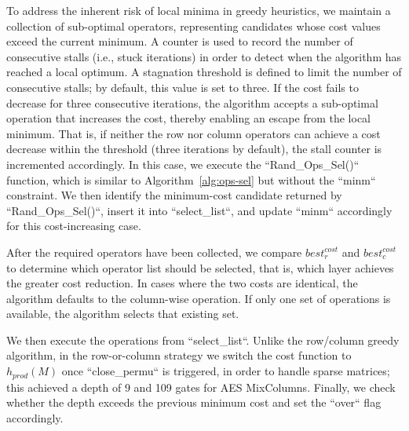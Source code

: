 To address the inherent risk of local minima in greedy heuristics, we 
maintain a collection of sub-optimal operators, representing candidates 
whose cost values exceed the current minimum. A counter is used to 
record the number of consecutive stalls (i.e., stuck iterations) in 
order to detect when the algorithm has reached a local optimum. A 
stagnation threshold is defined to limit the number of consecutive 
stalls; by default, this value is set to three. If the cost fails to 
decrease for three consecutive iterations, the algorithm accepts a 
sub-optimal operation that increases the cost, thereby enabling an 
escape from the local minimum. That is, if neither the row nor column 
operators can achieve a cost decrease within the threshold (three 
iterations by default), the stall counter is incremented accordingly. 
In this case, we execute the ``Rand\_Ops\_Sel()`` function, which 
is similar to Algorithm~\ref{alg:ops-sel} but without the ``minm`` 
constraint. We then identify the minimum-cost candidate returned by 
``Rand\_Ops\_Sel()``, insert it into ``select\_list``, and 
update ``minm`` accordingly for this cost-increasing case.

After the required operators have been collected, we compare 
$best_{r}^{cost}$ and $best_{c}^{cost}$ to determine which operator list 
should be selected, that is, which layer achieves the greater cost 
reduction. In cases where the two costs are identical, the algorithm 
defaults to the column-wise operation. If only one set of operations is 
available, the algorithm selects that existing set.

We then execute the operations from ``select\_list``. Unlike the 
row/column greedy algorithm, in the row-or-column strategy we switch the 
cost function to $h_{prod}(M)$ once ``close\_permu`` is triggered, in 
order to handle sparse matrices; this achieved a depth of 9 and 109 gates 
for AES MixColumns. Finally, we check whether the depth exceeds the 
previous minimum cost and set the ``over`` flag accordingly.

